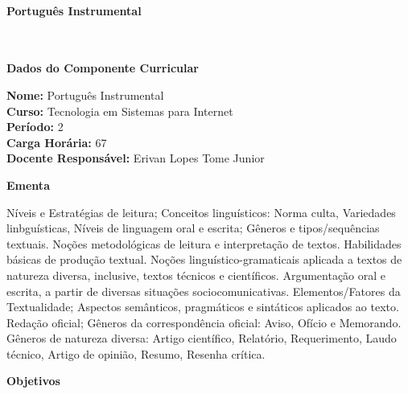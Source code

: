 \paragraph{Portugu\^es Instrumental} \


\begin{snugshade}\begin{center}\textbf{
    Dados do Componente Curricular
}\end{center}\end{snugshade}

\noindent \textbf{Nome:}                Portugu\^es Instrumental
\\        \textbf{Curso:}               Tecnologia em Sistemas para Internet
\\        \textbf{Período:}             \unit{2}{\degree}
\\        \textbf{Carga Horária:}       \unit{67}{\hour}
\\        \textbf{Docente Responsável:} Erivan Lopes Tome Junior


\begin{snugshade}\begin{center}\textbf{
    Ementa
\vphantom{q}}\end{center}\end{snugshade}

\noindent
Níveis e Estratégias de leitura; Conceitos linguísticos: Norma culta, Variedades linbguísticas, Níveis de linguagem oral e escrita; Gêneros e tipos/sequências textuais. Noções metodológicas de leitura e interpretação de textos. Habilidades básicas de produção textual. Noções linguístico-gramaticais aplicada a textos de natureza diversa, inclusive, textos técnicos e científicos. Argumentação oral e escrita, a partir de diversas situações sociocomunicativas. Elementos/Fatores da Textualidade; Aspectos semânticos, pragmáticos e sintáticos aplicados ao texto. Redação oficial; Gêneros da correspondência oficial: Aviso, Ofício e Memorando. Gêneros de natureza diversa: Artigo científico, Relatório, Requerimento, Laudo técnico, Artigo de opinião, Resumo, Resenha crítica.

\begin{snugshade}\begin{center}\textbf{
    Objetivos
}\end{center}\end{snugshade}

